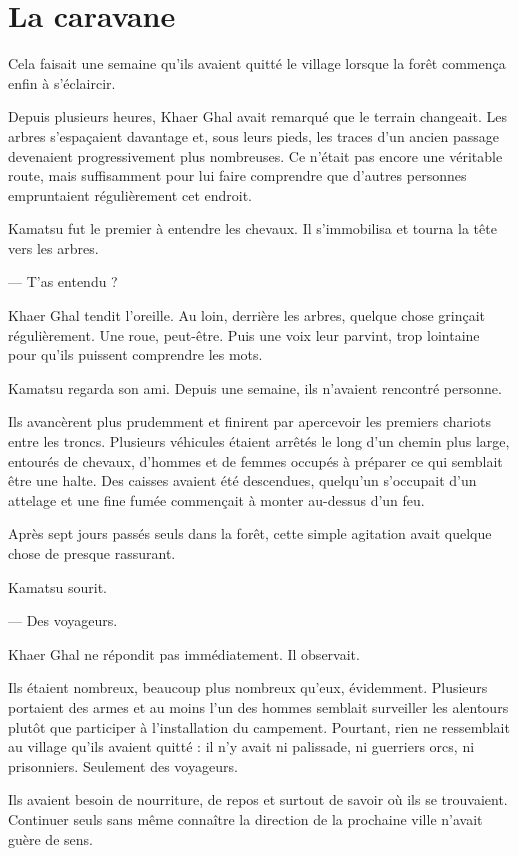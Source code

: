 \chapter{La caravane}
\label{chap:la-caravane}

Cela faisait une semaine qu'ils avaient quitté le village lorsque la forêt
commença enfin à s'éclaircir.

Depuis plusieurs heures, Khaer Ghal avait remarqué que le terrain changeait.
Les arbres s'espaçaient davantage et, sous leurs pieds, les traces d'un ancien
passage devenaient progressivement plus nombreuses. Ce n'était pas encore une
véritable route, mais suffisamment pour lui faire comprendre que d'autres
personnes empruntaient régulièrement cet endroit.

Kamatsu fut le premier à entendre les chevaux. Il s'immobilisa et tourna la
tête vers les arbres.

— T'as entendu ?

Khaer Ghal tendit l'oreille. Au loin, derrière les arbres, quelque chose
grinçait régulièrement. Une roue, peut-être. Puis une voix leur parvint, trop
lointaine pour qu'ils puissent comprendre les mots.

Kamatsu regarda son ami. Depuis une semaine, ils n'avaient rencontré personne.

Ils avancèrent plus prudemment et finirent par apercevoir les premiers chariots
entre les troncs. Plusieurs véhicules étaient arrêtés le long d'un chemin plus
large, entourés de chevaux, d'hommes et de femmes occupés à préparer ce qui
semblait être une halte. Des caisses avaient été descendues, quelqu'un
s'occupait d'un attelage et une fine fumée commençait à monter au-dessus d'un
feu.

Après sept jours passés seuls dans la forêt, cette simple agitation avait
quelque chose de presque rassurant.

Kamatsu sourit.

— Des voyageurs.

Khaer Ghal ne répondit pas immédiatement. Il observait.

Ils étaient nombreux, beaucoup plus nombreux qu'eux, évidemment. Plusieurs
portaient des armes et au moins l'un des hommes semblait surveiller les
alentours plutôt que participer à l'installation du campement. Pourtant, rien
ne ressemblait au village qu'ils avaient quitté : il n'y avait ni palissade,
ni guerriers orcs, ni prisonniers. Seulement des voyageurs.

Ils avaient besoin de nourriture, de repos et surtout de savoir où ils se
trouvaient. Continuer seuls sans même connaître la direction de la prochaine
ville n'avait guère de sens.

